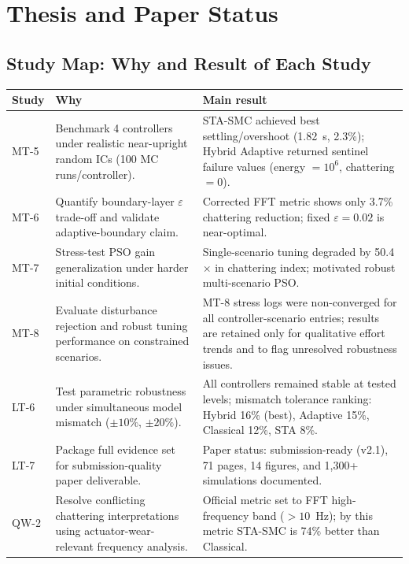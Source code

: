\documentclass[10pt, a4paper]{article}
\begin{document}
\section{Thesis and Paper Status}

\subsection{Study Map: Why and Result of Each Study}

\begin{table}[t]
\centering
\footnotesize
\begin{tabularx}{\textwidth}{@{}p{1.2cm}p{5.2cm}X@{}}
\toprule
\textbf{Study} & \textbf{Why} & \textbf{Main result} \\
\midrule
MT-5 &
Benchmark 4 controllers under realistic near-upright random ICs (100 MC runs/controller). &
STA-SMC achieved best settling/overshoot (1.82~s, 2.3\%); Hybrid Adaptive returned sentinel failure values (energy $=10^6$, chattering $=0$). \\
MT-6 &
Quantify boundary-layer $\varepsilon$ trade-off and validate adaptive-boundary claim. &
Corrected FFT metric shows only 3.7\% chattering reduction; fixed $\varepsilon=0.02$ is near-optimal. \\
MT-7 &
Stress-test PSO gain generalization under harder initial conditions. &
Single-scenario tuning degraded by 50.4$\times$ in chattering index; motivated robust multi-scenario PSO. \\
MT-8 &
Evaluate disturbance rejection and robust tuning performance on constrained scenarios. &
MT-8 stress logs were non-converged for all controller-scenario entries; results are retained only for qualitative effort trends and to flag unresolved robustness issues. \\
LT-6 &
Test parametric robustness under simultaneous model mismatch ($\pm10\%$, $\pm20\%$). &
All controllers remained stable at tested levels; mismatch tolerance ranking: Hybrid 16\% (best), Adaptive 15\%, Classical 12\%, STA 8\%. \\
LT-7 &
Package full evidence set for submission-quality paper deliverable. &
Paper status: submission-ready (v2.1), 71 pages, 14 figures, and 1,300+ simulations documented. \\
QW-2 &
Resolve conflicting chattering interpretations using actuator-wear-relevant frequency analysis. &
Official metric set to FFT high-frequency band ($>10$~Hz); by this metric STA-SMC is 74\% better than Classical. \\
\bottomrule
\end{tabularx}
\end{table}
\end{document}

